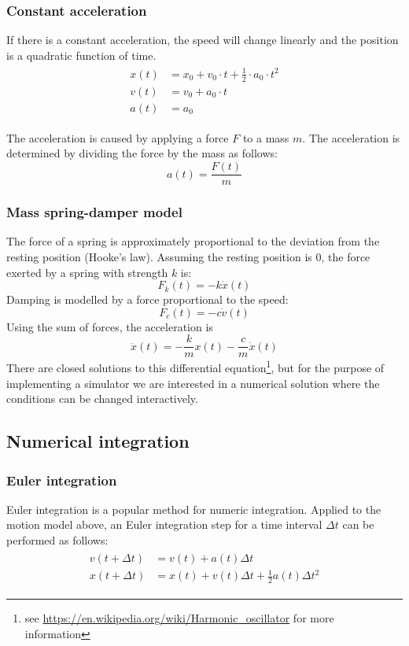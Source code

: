\documentclass[10pt,a4paper,twoside]{article}
\begin{document}
\subsubsection{Constant acceleration}
If there is a constant acceleration, the speed will change linearly and the position is a quadratic function of time.
\begin{align*}
  \begin{split}
    x(t) & = x_0 + v_0 \cdot t + \frac{1}{2} \cdot a_0 \cdot t^2\\
    v(t) & = v_0 + a_0 \cdot t\\
    a(t) & = a_0
  \end{split}
\end{align*}

The acceleration is caused by applying a force $F$ to a mass $m$.
The acceleration is determined by dividing the force by the mass as follows:
\begin{equation*}
  a(t)=\frac{F(t)}{m}
\end{equation*}

\subsubsection{Mass spring-damper model}
The force of a spring is approximately proportional to the deviation from the resting position (Hooke's law).
Assuming the resting position is $0$, the force exerted by a spring with strength $k$ is:
\begin{equation*}
  F_k(t)=-k \dot x(t)
\end{equation*}
Damping is modelled by a force proportional to the speed:
\begin{equation*}
  F_c(t)=-c \dot v(t)
\end{equation*}
Using the sum of forces, the acceleration is
\begin{equation*}
  \ddot{x}(t) = -\frac{k}{m} x(t) - \frac{c}{m}\dot{x}(t)
\end{equation*}
There are closed solutions to this differential equation\footnote{see \url{https://en.wikipedia.org/wiki/Harmonic_oscillator} for more information}, but for the purpose of implementing a simulator we are interested in a numerical solution where the conditions can be changed interactively.

\subsection{Numerical integration}
\subsubsection{Euler integration}
Euler integration is a popular method for numeric integration.
Applied to the motion model above, an Euler integration step for a time interval $\Delta t$ can be performed as follows:
\begin{align*}
  \begin{split}
    v(t + \Delta t) &= v(t) + a(t) \Delta t\\
    x(t + \Delta t) &= x(t) + v(t) \Delta t + \frac{1}{2} a(t) \Delta t^2
  \end{split}
\end{align*}
\end{document}
